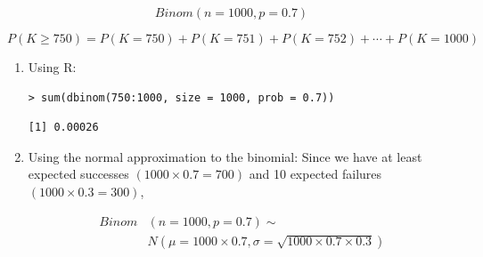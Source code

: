 \documentclass[slidestop,compress,mathserif,12pt,t,professionalfonts,xcolor=table]{beamer}
\begin{document}
\begin{frame}[fragile]
\frametitle{}


\vspace{-0.5cm}
\pause

\[ Binom(n = 1000, p = 0.7) \]
\vspace{-1cm}

\pause

{\small \[ P(K \ge 750) = P(K = 750) + P(K = 751) + P(K = 752) + \cdots + P(K = 1000) \]}

\pause

\begin{enumerate}

\item Using R:
{\footnotesize
\begin{Verbatim}[frame=single, formatcom=\color{blue}]
> sum(dbinom(750:1000, size = 1000, prob = 0.7))
\end{Verbatim}
}
{\footnotesize
\begin{Verbatim}[frame=single, formatcom=\color{gray}]
[1] 0.00026
\end{Verbatim}
}

\pause

\item Using the normal approximation to the binomial: Since we have at least expected successes
$(1000 \times 0.7 = 700)$ and 10 expected failures $(1000 \times 0.3 = 300)$,

\begin{align*}
Binom&(n = 1000, p = 0.7) \sim \\
&N(\mu = 1000 \times 0.7, \sigma = \sqrt{1000 \times 0.7 \times 0.3}) 
\end{align*}

\end{enumerate}

\end{frame}


\begin{frame}

\vfill


\vfill

\end{frame}
\end{document}
